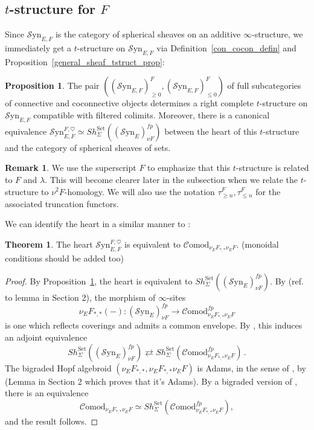 \documentclass[10pt]{amsart}
\theoremstyle{definition}
\numberwithin{figure}{section}
\numberwithin{equation}{section}
\newtheorem{theorem}[figure]{Theorem}
\newtheorem{proposition}[figure]{Proposition}
\newtheorem{remark}[figure]{Remark}
\theoremstyle{cited}
\newcommand{\Syn}{\mathcal{S}\mathrm{yn}}
\newcommand{\Comod}{\mathcal{C}\mathrm{omod}}
\begin{document}
\subsection{$t$-structure for $F$}
\label{F_tstruct_subsec}

Since $\Syn_{E,F}$ is the category of spherical sheaves on an additive $\infty$-structure, we immediately get a $t$-structure on $\Syn_{E,F}$ via Definition~\ref{con_cocon_defin} and Proposition~\ref{general_sheaf_tstruct_prop}:

\begin{proposition}
\label{F_bisyn_tstruct_prop}
The pair $((\Syn_{E,F})_{\geq 0}^F,(\Syn_{E,F})_{\leq 0}^F)$ of full subcategories of connective and coconnective objects determines a right
complete $t$-structure on $\Syn_{E,F}$ compatible with filtered colimits. Moreover, there is a canonical equivalence $\Syn_{E,F}^{F,\heartsuit}\simeq Sh_{\Sigma}^{\mathrm{Set}}((\Syn_E)_{\nu F}^{fp})$ between the heart of this $t$-structure and the category of
spherical sheaves of sets.  
\end{proposition}

\begin{remark}
We use the superscript $F$ to emphasize that this $t$-structure is related to $F$ and $\lambda$. This will become clearer later in the subsection when we relate the $t$-structure to $\nu^2F$-homology. We will also use the notation $\tau_{\geq n}^F, \tau_{\leq n}^F$ for the associated truncation functors.
\end{remark}

We can identify the heart in a similar manner to \cite{Pst22}:

\begin{theorem}
    The heart $\Syn_{E,F}^{F,\heartsuit}$ is equivalent to $\Comod_{\nu_EF_{*,*}\nu_EF}$. (monoidal conditions should be added too)
\end{theorem}

\begin{proof}
    By Proposition~\ref{F_bisyn_tstruct_prop}, the heart is equivalent to $Sh_{\Sigma}^{\mathrm{Set}}((\Syn_E)_{\nu F}^{fp})$. By (ref. to lemma in Section 2), the morphism of $\infty$-sites $$\nu_EF_{*,*}(-):(\Syn_E)_{\nu F}^{fp}\to\Comod_{\nu_EF_{*,*}\nu_EF}^{fp}$$ is one which reflects coverings and admits a common envelope. By \cite[Rem. 2.50]{Pst22}, this induces an adjoint equivalence $$Sh_{\Sigma}^{\mathrm{Set}}((\Syn_E)_{\nu F}^{fp})\rightleftarrows Sh_{\Sigma}^{\mathrm{Set}}(\Comod_{\nu_EF_{*,*}\nu_EF}^{fp})\,.$$
The bigraded Hopf algebroid $(\nu_EF_{*,*},\nu_EF_{*,*}\nu_EF)$ is Adams, in the sense of \cite[Def. 3.1]{Pst22}, by (Lemma in Section 2 which proves that it's Adams). By a bigraded version of \cite[2.1.12]{GH05}, \cite[Thm. 3.2]{Pst22} there is an equivalence
$$
\Comod_{\nu_EF_{*,*}\nu_EF}\simeq Sh_{\Sigma}^{\mathrm{Set}}(\Comod_{\nu_EF_{*,*}\nu_EF}^{fp}),
$$
and the result follows.
\end{proof}
\end{document}
